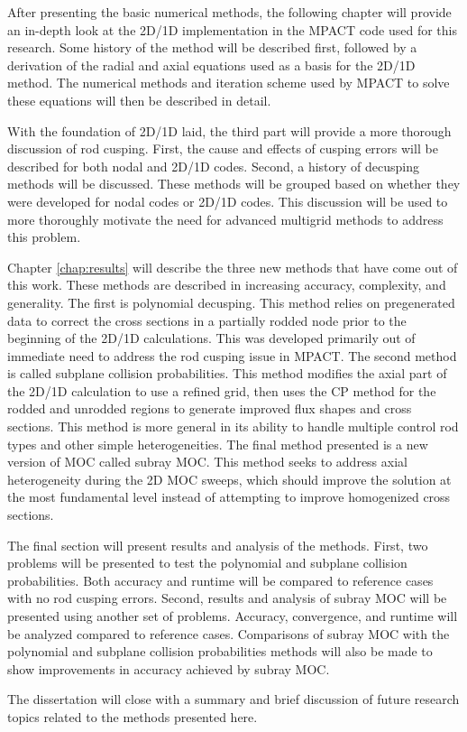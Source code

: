 After presenting the basic numerical methods, the following chapter will provide an in-depth look at the 2D/1D implementation in the MPACT code used for this research.  Some history of the method will be described first, followed by a derivation of the radial and axial equations used as a basis for the 2D/1D method.  The numerical methods and iteration scheme used by MPACT to solve these equations will then be described in detail.

With the foundation of 2D/1D laid, the third part will provide a more thorough discussion of rod cusping.  First, the cause and effects of cusping errors will be described for both nodal and 2D/1D codes.  Second, a history of decusping methods will be discussed.  These methods will be grouped based on whether they were developed for nodal codes or 2D/1D codes.  This discussion will be used to more thoroughly motivate the need for advanced multigrid methods to address this problem.

Chapter \ref{chap:results} will describe the three new methods that have come out of this work.  These methods are described in increasing accuracy, complexity, and generality.  The first is polynomial decusping.  This method relies on pregenerated data to correct the cross sections in a partially rodded node prior to the beginning of the 2D/1D calculations.  This was developed primarily out of immediate need to address the rod cusping issue in MPACT.  The second method is called subplane collision probabilities.  This method modifies the axial part of the 2D/1D calculation to use a refined grid, then uses the CP method for the rodded and unrodded regions to generate improved flux shapes and cross sections.  This method is more general in its ability to handle multiple control rod types and other simple heterogeneities.  The final method presented is a new version of MOC called subray MOC.  This method seeks to address axial heterogeneity during the 2D MOC sweeps, which should improve the solution at the most fundamental level instead of attempting to improve homogenized cross sections.

The final section will present results and analysis of the methods.  First, two problems will be presented to test the polynomial and subplane collision probabilities.  Both accuracy and runtime will be compared to reference cases with no rod cusping errors.  Second, results and analysis of subray MOC will be presented using another set of problems.  Accuracy, convergence, and runtime will be analyzed compared to reference cases.  Comparisons of subray MOC with the polynomial and subplane collision probabilities methods will also be made to show improvements in accuracy achieved by subray MOC.

The dissertation will close with a summary and brief discussion of future research topics related to the methods presented here.